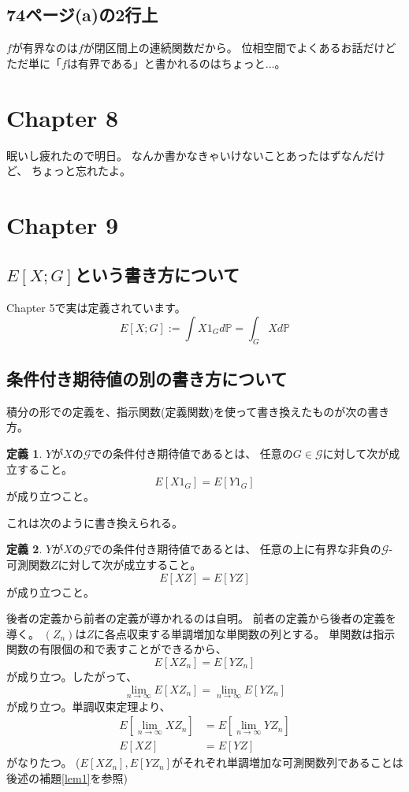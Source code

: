 \documentclass[11pt, a4paper]{jsarticle}
\theoremstyle{definition}
\newtheorem{defn}{定義}[section]
\newcommand{\PP}{{\mathbb{P}}} %
\begin{document}
    \subsection{74ページ(a)の2行上}
      $f$が有界なのは$f$が閉区間上の連続関数だから。
      位相空間でよくあるお話だけどただ単に「$f$は有界である」と書かれるのはちょっと...。

  \section{Chapter 8}
    眠いし疲れたので明日。
    なんか書かなきゃいけないことあったはずなんだけど、
    ちょっと忘れたよ。

  \section{Chapter 9}
    \subsection{$E[X;G]$という書き方について}
      Chapter 5で実は定義されています。
      \[
        E[X;G] := \int X 1_G d\PP = \int_G X d\PP
      \]

    \subsection{条件付き期待値の別の書き方について}
      積分の形での定義を、指示関数(定義関数)を使って書き換えたものが次の書き方。
      \begin{defn}
        $Y$が$X$の$\mathcal{G}$での条件付き期待値であるとは、
        任意の$G \in \mathcal{G}$に対して次が成立すること。
        \[
          E[X1_G ] = E[Y1_G]
        \]
        が成り立つこと。
      \end{defn}
      これは次のように書き換えられる。
      \begin{defn}
        $Y$が$X$の$\mathcal{G}$での条件付き期待値であるとは、
        任意の上に有界な非負の$\mathcal{G}$-可測関数$Z$に対して次が成立すること。
        \[
          E[XZ] = E[YZ]
        \]
        が成り立つこと。
      \end{defn}

      後者の定義から前者の定義が導かれるのは自明。
      前者の定義から後者の定義を導く。
      $(Z_n)$は$Z$に各点収束する単調増加な単関数の列とする。
      単関数は指示関数の有限個の和で表すことができるから、
      \[
        E[XZ_n] = E[YZ_n]
      \]
      が成り立つ。したがって、
      \[
        \lim_{n \to \infty} E[XZ_n] = \lim_{n \to \infty} E[YZ_n]
      \]
      が成り立つ。単調収束定理より、
      \begin{align*}
        E[\lim_{n \to \infty} XZ_n] &= E[\lim_{n \to \infty} YZ_n] \\
        E[XZ] &= E[YZ]
      \end{align*}
      がなりたつ。
      ($E[XZ_n],E[YZ_n]$がそれぞれ単調増加な可測関数列であることは後述の補題\ref{lem1}を参照)
\end{document}
